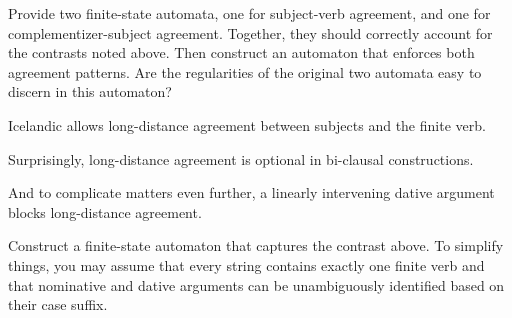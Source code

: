 \begin{exercise}
    Provide two finite-state automata, one for subject-verb agreement, and one for complementizer-subject agreement.
    Together, they should correctly account for the contrasts noted above.
    Then construct an automaton that enforces both agreement patterns.
    Are the regularities of the original two automata easy to discern in this automaton?
\end{exercise}

\begin{exercise}
    Icelandic allows long-distance agreement between subjects and the finite verb.
    \begin{exe}
    \end{exe}
    Surprisingly, long-distance agreement is optional in bi-clausal constructions.
    \begin{exe}
        \ex
        \begin{xlist}
        \end{xlist}
    \end{exe}
    And to complicate matters even further, a linearly intervening dative argument blocks long-distance agreement.
    \begin{exe}
        \ex
        \begin{xlist}
        \end{xlist}
    \end{exe}
    Construct a finite-state automaton that captures the contrast above.
    To simplify things, you may assume that every string contains exactly one finite verb and that nominative and dative arguments can be unambiguously identified based on their case suffix.
\end{exercise}

